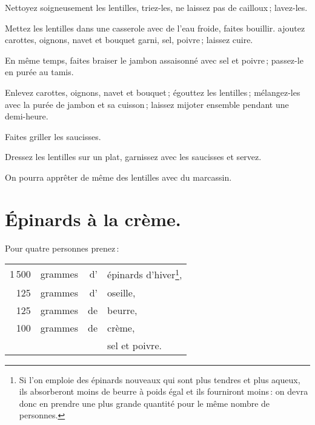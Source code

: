 Nettoyez soigneusement les lentilles, triez-les, ne laissez pas de cailloux ;
lavez-les.

Mettez les lentilles dans une casserole avec de l'eau froide, faites bouillir.
ajoutez carottes, oignons, navet et bouquet garni, sel, poivre ; laissez cuire.

En même temps, faites braiser le jambon assaisonné avec sel et poivre ;
passez-le en purée au tamis.

Enlevez carottes, oignons, navet et bouquet ; égouttez les lentilles ;
mélangez-les avec la purée de jambon et sa cuisson ; laissez mijoter ensemble
pendant une demi-heure.

Faites griller les saucisses.

Dressez les lentilles sur un plat, garnissez avec les saucisses et servez.

\sk

On pourra apprêter de même des lentilles avec du marcassin.

\section*{\centering Épinards à la crème.}
{}
\label{pg0745} \hypertarget{p0745}{}

Pour quatre personnes prenez :

\footnotesize
\begin{longtable}{rrrp{16em}}
  1 500 & grammes & d' & épinards d'hiver\footnote{Si l’on emploie des épinards nouveaux
                                                qui sont plus tendres et plus aqueux, ils
                                                absorberont moins de beurre à poids égal
                                                et ils fourniront moins : on devra donc
                                                en prendre une plus grande quantité pour
                                                le même nombre de personnes.},                            \\
    125 & grammes & d' & oseille,                                                                         \\
    125 & grammes & de & beurre,                                                                          \\
    100 & grammes & de & crème,                                                                           \\
        &         &    & sel et poivre.                                                                   \\
\end{longtable}
\normalsize

